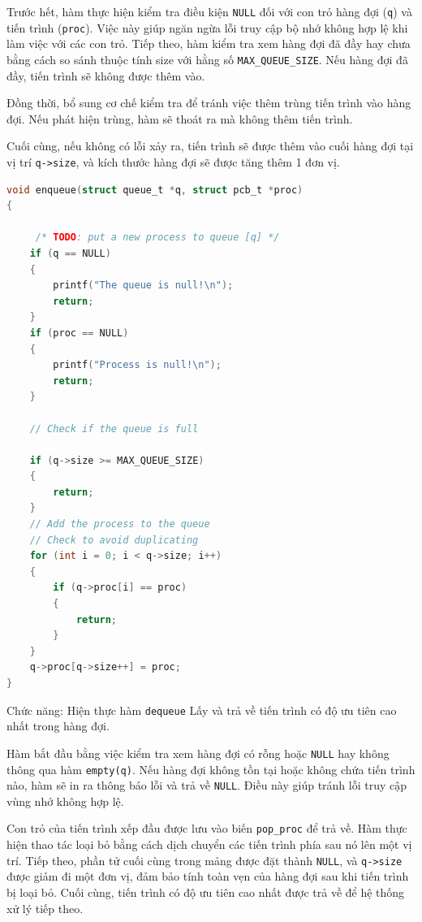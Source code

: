  Trước hết, hàm thực hiện kiểm tra điều kiện \texttt{NULL} đối với con trỏ hàng đợi (\texttt{q}) và tiến trình (\texttt{proc}). Việc này giúp ngăn ngừa lỗi truy cập bộ nhớ không hợp lệ khi làm việc với các con trỏ. Tiếp theo, hàm kiểm tra xem hàng đợi đã đầy hay chưa bằng cách so sánh thuộc tính size với hằng số \texttt{MAX\_QUEUE\_SIZE}. Nếu hàng đợi đã đầy, tiến trình sẽ không được thêm vào.

 Đồng thời, bổ sung cơ chế kiểm tra để tránh việc thêm trùng tiến trình vào hàng đợi. Nếu phát hiện trùng, hàm sẽ thoát ra mà không thêm tiến trình.

Cuối cùng, nếu không có lỗi xảy ra, tiến trình sẽ được thêm vào cuối hàng đợi tại vị trí \colorbox{gray!10}{\texttt{q->size}}, và kích thước hàng đợi sẽ được tăng thêm 1 đơn vị.

\begin{lstlisting}[style=Cstyle,language=C]
void enqueue(struct queue_t *q, struct pcb_t *proc)
{

     /* TODO: put a new process to queue [q] */
    if (q == NULL)
    {
        printf("The queue is null!\n");
        return;
    }
    if (proc == NULL)
    {
        printf("Process is null!\n");
        return;
    }

    // Check if the queue is full

    if (q->size >= MAX_QUEUE_SIZE)
    {
        return;
    }
    // Add the process to the queue
    // Check to avoid duplicating
    for (int i = 0; i < q->size; i++)
    {
        if (q->proc[i] == proc)
        {
            return;
        }
    }
    q->proc[q->size++] = proc;
}
\end{lstlisting}



\vspace{0.5 cm}

Chức năng: Hiện thực hàm \colorbox{gray!10}{\texttt{dequeue}} Lấy và trả về tiến trình có độ ưu tiên cao nhất trong hàng đợi.

Hàm bắt đầu bằng việc kiểm tra xem hàng đợi có rỗng hoặc \texttt{NULL} hay không thông qua hàm \colorbox{gray!10}{\texttt{empty(q)}}. Nếu hàng đợi không tồn tại hoặc không chứa tiến trình nào, hàm sẽ in ra thông báo lỗi và trả về \texttt{NULL}. Điều này giúp tránh lỗi truy cập vùng nhớ không hợp lệ.

 Con trỏ của tiến trình xếp đầu được lưu vào biến \colorbox{gray!10}{\texttt{pop\_proc}} để trả về.
 Hàm thực hiện thao tác loại bỏ bằng cách dịch chuyển các tiến trình phía sau nó lên một vị trí. Tiếp theo, phần tử cuối cùng trong mảng được đặt thành \texttt{NULL}, và \colorbox{gray!10}{\texttt{q->size}} được giảm đi một đơn vị, đảm bảo tính toàn vẹn của hàng đợi sau khi tiến trình bị loại bỏ. Cuối cùng, tiến trình có độ ưu tiên cao nhất được trả về để hệ thống xử lý tiếp theo.

